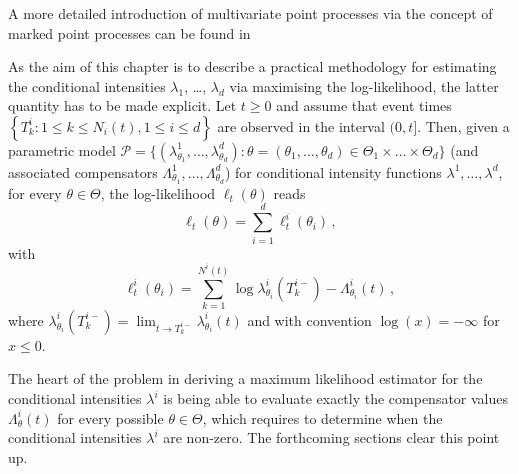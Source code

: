     \begin{remark}
    A more detailed introduction of multivariate point processes via the concept of marked point processes can be found in \textcite[Chapter 6.4]{DaleyV1}
    \end{remark}

    As the aim of this chapter is to describe a practical methodology for estimating the conditional intensities \(\lambda_1\), \dots, \(\lambda_d\) via maximising the log-likelihood, the latter quantity has to be made explicit.
    Let \(t \ge 0\) and assume that event times
    $\left\{ T_k^i : 1 \le k \le N_i(t), 1 \le i \le d \right\}$
    are observed in the interval \((0, t]\).
    Then, given a parametric model $\mathcal{P} = \{(\lambda_{\theta_1}^1, \dots, \lambda_{\theta_d}^d)\colon \theta = (\theta_1, \dots, \theta_d) \in \Theta_1 \times \dots \times \Theta_d\}$ (and associated compensators \(\Lambda_{\theta_1}^1, \dots, \Lambda_{\theta_d}^d\)) for conditional intensity functions \(\lambda^1, \dots, \lambda^d\), for every \(\theta \in \Theta\), the log-likelihood $\ell_t(\theta)$ reads \textcite[Proposition 7.3.III.]{DaleyV1}
    \begin{equation*}
      \ell_t(\theta) = \sum_{i=1}^{d}{\ell_t^i(\theta_i)}\,,\nonumber 
    \end{equation*}
    with
    \begin{equation}\label{eq:chap3_general_log_likelihood}
      \ell_t^{i}(\theta_i) = \sum_{k=1}^{N^i(t)}{\log{\lambda^i_{\theta_i}(T_k^{i-})}} - \Lambda_{\theta_i}^i(t)\,,
    \end{equation}
    where $\lambda^i_{\theta_i}(T_k^{i-}) = \lim_{t\to T_k^{i-}}{\lambda_{\theta_i}^i(t)}$ and with convention $\log{(x)} = -\infty$ for $x\leq 0$.

    The heart of the problem in deriving a maximum likelihood estimator for the conditional intensities \(\lambda^i\) is being able to evaluate exactly the compensator values \(\Lambda_\theta^i(t)\) for every possible \(\theta \in \Theta\), which requires to determine when the conditional intensities \(\lambda^i\) are non-zero.
    The forthcoming sections clear this point up.


